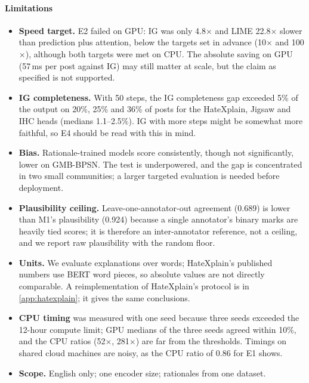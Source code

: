 \documentclass[preprint,12pt,authoryear]{elsarticle}
\begin{document}
\paragraph{Limitations}
\begin{itemize}
\item \textbf{Speed target.} E2 failed on GPU: IG was only 4.8$\times$ and LIME 22.8$\times$ slower than prediction plus attention, below the targets set in advance (10$\times$ and 100$\times$), although both targets were met on CPU. The absolute saving on GPU (57\,ms per post against IG) may still matter at scale, but the claim as specified is not supported.
\item \textbf{IG completeness.} With 50 steps, the IG completeness gap exceeded 5\% of the output on 20\%, 25\% and 36\% of posts for the HateXplain, Jigsaw and IHC heads (medians 1.1--2.5\%). IG with more steps might be somewhat more faithful, so E4 should be read with this in mind.
\item \textbf{Bias.} Rationale-trained models score consistently, though not significantly, lower on GMB-BPSN. The test is underpowered, and the gap is concentrated in two small communities; a larger targeted evaluation is needed before deployment.
\item \textbf{Plausibility ceiling.} Leave-one-annotator-out agreement (0.689) is lower than M1's plausibility (0.924) because a single annotator's binary marks are heavily tied scores; it is therefore an inter-annotator reference, not a ceiling, and we report raw plausibility with the random floor.
\item \textbf{Units.} We evaluate explanations over words; HateXplain's published numbers use BERT word pieces, so absolute values are not directly comparable. A reimplementation of HateXplain's protocol is in \ref{app:hatexplain}; it gives the same conclusions.
\item \textbf{CPU timing} was measured with one seed because three seeds exceeded the 12-hour compute limit; GPU medians of the three seeds agreed within 10\%, and the CPU ratios (52$\times$, 281$\times$) are far from the thresholds. Timings on shared cloud machines are noisy, as the CPU ratio of 0.86 for E1 shows.
\item \textbf{Scope.} English only; one encoder size; rationales from one dataset.
\end{itemize}

\end{document}
